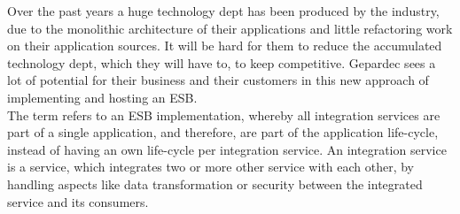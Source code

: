 Over the past years a huge technology dept has been produced by the industry, due to the monolithic architecture of their applications and little refactoring work on their application sources. It will be hard for them to reduce the accumulated technology dept, which they will have to, to keep competitive. Gepardec sees a lot of potential for their business and their customers in this new approach of implementing and hosting an ESB. \\

The term  refers to an ESB implementation, whereby all integration services are part of a single application, and therefore, are part of the application life-cycle, instead of having an own life-cycle per integration service. An integration service is a service, which integrates two or more other service with each other, by handling aspects like data transformation or security between the integrated service and its consumers.  